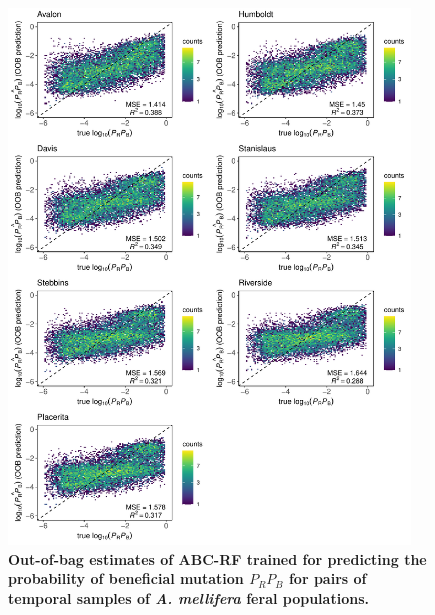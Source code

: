 \documentclass[a4paper, 12pt]{article}
\begin{document}
\begin{figure}[ht]
  \centering
  \includegraphics[width=0.95\textwidth]{Figures/FigureS18_combined_plot_prps.pdf}
  \small\caption{\textbf{Out-of-bag estimates of ABC-RF trained for predicting the probability of beneficial mutation $P_RP_B$ for pairs of temporal samples of \textit{A. mellifera} feral populations.}}
  \label{fig:supple_feralbee_prpb}
\end{figure}
\end{document}
